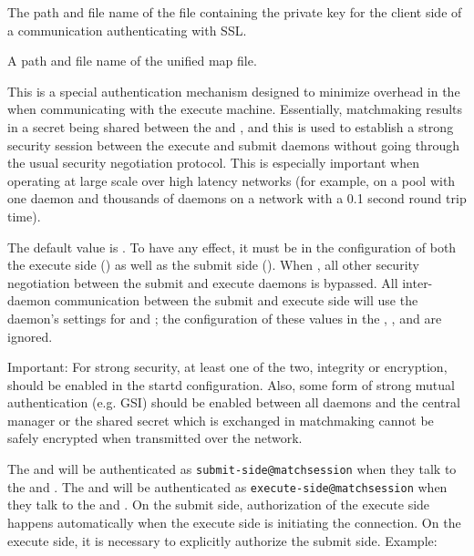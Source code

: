 \begin{description}
\label{param:AuthSSLClientKeyfile}
\item[\Macro{AUTH\_SSL\_CLIENT\_KEYFILE}]
  The path and file name of the file containing the private key
  for the client side of a communication authenticating with SSL.


\label{param:CertificateMapfile}
\item[\Macro{CERTIFICATE\_MAPFILE}]
  A path and file name of the unified map file.

\label{param:SecEnableMatchPasswordAuthentication}
\item[\Macro{SEC\_ENABLE\_MATCH\_PASSWORD\_AUTHENTICATION}]
  This is a special authentication mechanism designed to minimize
  overhead in the  when communicating with the execute
  machine.  Essentially, matchmaking results in a secret being shared
  between the  and , and this is used to
  establish a strong security session between the execute and submit
  daemons without going through the usual security negotiation protocol.
  This is especially important when operating at large scale over high
  latency networks (for example, on a pool with one  daemon
  and thousands of  daemons on a network with a 0.1 second 
  round trip time).

  The default value is .  
  To have any effect, it must be  in the configuration of both
  the execute side () as well as the submit side 
  ().
  When ,
  all other security negotiation
  between the submit and execute daemons is bypassed.  All inter-daemon
  communication between the submit and execute side will use the
   daemon's settings for  and
  ; the configuration of these values in
  the , , and  are ignored.

  Important: For strong security, at least one of the two, integrity or
  encryption, should be enabled in the startd configuration.  Also, some
  form of strong mutual authentication (e.g. GSI) should be enabled
  between all daemons and the central manager or the shared secret which
  is exchanged in matchmaking cannot be safely encrypted when transmitted
  over the network.

  The  and  will be authenticated as
  \verb|submit-side@matchsession| when they talk to the  and
  .  The  and  will be authenticated as
  \verb|execute-side@matchsession| when they talk to the  and
  .  On the submit side, authorization of the execute side happens
  automatically when the execute side is initiating the connection.
  On the execute side, it is necessary to explicitly
  authorize the submit side.  Example:


\end{description}
